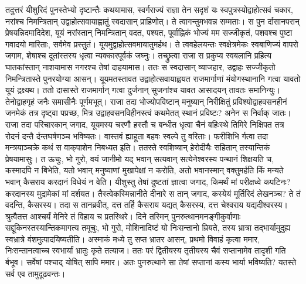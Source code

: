 \adhyAya
{}
\vakya तदुत्तरं यीशुरिदं पुनस्तेभ्यो दृष्टान्तैः कथयामास, स्वर्गराज्यं राज्ञा तेन सदृशं यः स्वपुत्रस्योद्वाहोत्सवं चकार,
\vakya नरांश्च निमन्त्रितान् उद्वाहोत्सवायाह्वातुं स्वदासान् प्राहिणोत्।
\vakya ते त्वागन्तुमभवन्न सम्मताः।
\vakya स पुन र्दासानपरान् प्रेषयन्निदमादिदेश, यूयं नरांस्तान् निमन्त्रितान् वदत, पश्यत, पूर्वाह्णिकं भोज्यं मम सज्जीकृतं, पशवश्च पुष्टा गवादयो मारिताः, सर्वमेव प्रस्तुतं। यूयमुद्वाहोत्सवमायातुमर्हथ।
\vakya ते त्ववहेलयन्तः स्वक्षेत्रमेकः स्वबाणिज्यं वापरो जगाम,
\vakya शेषाश्च दूतांस्तस्य धृत्वा न्यक्कारपूर्वकं जघ्नुः।
\vakya तच्छ्रुत्वा राजा स प्रकुप्य स्वबलानि प्रहित्य घातकांस्तान् नाशयामास नगरश्च तेषां दाहयामास।
\vakya ततः स स्वदासान् व्याजहार, उद्वाहः सज्जीकृतो निमन्त्रितास्ते पुनरयोग्या आसन्।
\vakya यूयमतस्तावत उद्वाहोत्सवायाह्वयत राजमार्गाणां मंयोगस्थानानि गत्वा यावतो यूयं द्रक्ष्यथ।
\vakya ततो दासास्ते राजमार्गान् गत्वा दुर्जनान् सुजनांश्च यावत आसादयन् तावतः समानिन्युः। तेनोद्वाहगृहं जनैः समासीनैः पूर्णमभूत्।
\vakya राजा तदा भोज्योपविष्टान् मनुष्यान् निरीक्षितुं प्रविश्योद्वाहवसनहीनं जनमेकं तत्र दृष्ट्वा पप्रच्छ,
\vakya मित्र उद्वाहवसनविहीनस्त्वं कथमेतत् स्थानं प्रविष्टः? अनेन स निर्वाक् जातः।
\vakya राजा तदा परिचारकान् जगाद, यूयमस्य चरणौ हस्तौ च बन्धीत धृत्वा चैनं बहिःस्थे तिमिरे निक्षिपत तत्र रोदनं दन्तै र्दन्तघर्षणञ्च भविष्यतः।
\vakya वास्तवं ह्याहूता बहवः स्वल्पे तु वरिताः।
\vakya फरीशिभि र्गत्वा तदा मन्त्रयाञ्चक्रे कथं स वाक्‌पाशेन निबध्यत इति।
\vakya ततस्ते स्वशिष्यान् हेरोदीयैः सहितान् तस्यान्तिकं प्रेषयामासुः। त ऊचुः, भो गुरो, वयं जानीमो यद् भवान् सत्यवान् सत्येनेश्वरस्य पन्थानं शिक्षयति च, कस्मादपि न बिभेति, यतो भवान् मनुष्याणां मुखापेक्षां न करोति,
\vakya अतो भवानस्मान् वक्तुमर्हति किं मन्यते भवान् कैसराय करदानं विधेयं न वेति।
\vakya यीशुस्तु तेषां दुष्टतां ज्ञात्वा जगाद, किमर्थं मां परीक्षध्वे कपटिनः?
\vakya करदानस्य मुद्रामेकां मां दर्शयत।
\vakya तैस्त्वेकस्मिन्नानीते दीनारे स तान् जगाद, कस्येयं मूर्तिरिदं लेखनञ्च? ते तं वदन्ति, कैसरस्य।
\vakya तदा स तानब्रवीत्, दत्त तर्हि कैसराय यद्यत् कैसरस्य, दत्त चेश्वराय यद्यदीश्वरस्य।
\vakya श्रुत्वैतत्त आश्चर्यं मेनिरे तं विहाय च प्रतस्थिरे।
\vakya दिने तस्मिन् पुनरुत्थानमनङ्गीकुर्वाणाः सद्दूकिनस्तस्यान्तिकमागत्य तमूचुः,
\vakya भो गुरो, मोशिनादिष्टं यो निःसन्तानो म्रियते, तस्य भ्रात्रा तद्भार्यामुदुह्य स्वभ्रात्रे वंशमुत्पादयिष्यतीति।
\vakya अस्माकं मध्ये तु सप्त भ्रातर आसन्, प्रथमो विवाहं कृत्वा ममार, निःसन्तानत्वाच्च स्वभार्यां भ्रातुः कृते तत्याज।
\vakya ततः परं द्वितीयस्य तृतीयस्य चैवं सप्तानामेव तादृशी गति र्बभूव।
\vakya सर्वेषां पश्चाद् योषित् सापि ममार।
\vakya अतः पुनरुत्थाने सा तेषां सप्तानां कस्य भार्या भविष्यति? यतस्ते सर्व एव तामुदूढवन्तः।
